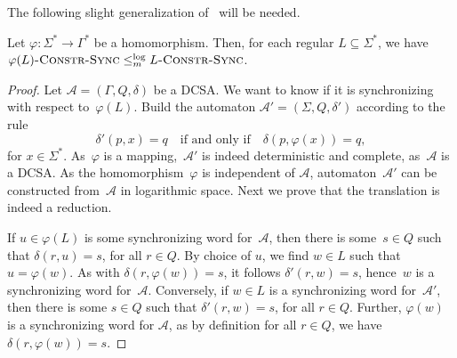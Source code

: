 The following slight generalization  %
of~\cite[Theorem 27]{DBLP:conf/mfcs/FernauGHHVW19} will be needed.

\begin{propositionrep}
\label{prop:hom_lower_bound_complexity}
 Let $\varphi \colon \Sigma^* \to \Gamma^*$ be a homomorphism.
 Then, for each regular $L \subseteq \Sigma^*$, we have 
 $\varphi(L)\textsc{-Constr-Sync} \le_m^{\log} L\textsc{-Constr-Sync}$.
\end{propositionrep}
\begin{proof}
 
 

 Let $\mathcal A = (\Gamma, Q, \delta)$ be a DCSA.
	We want to know if it is synchronizing with respect to~$\varphi(L)$.
	Build the automaton $\mathcal A' = (\Sigma, Q, \delta')$ according to the rule
	$$
	\delta'(p, x) = q\quad\mbox{if and only if}\quad
        \delta(p, \varphi(x)) = q,$$ for $x\in\Sigma^*$.
	As~$\varphi$ is a mapping,~$\mathcal A'$ is indeed deterministic and
        complete, as~$\mathcal A$ is a DCSA. As the homomorphism~$\varphi$ is
        independent of $\mathcal A$, automaton~$\mathcal A'$ can be constructed from~$\mathcal A$
        in logarithmic space.  Next we prove that the 
        translation is indeed a reduction.

        If $u \in \varphi(L)$ is some synchronizing word for~$\mathcal A$, then there is
        some~$s\in Q$ such that $\delta(r,u)=s$, for all $r\in Q$.  By
        choice of $u$, we find $w \in L$ such that $u = \varphi(w)$. As with
        $\delta(r,\varphi(w))=s$, it follows $\delta'(r,w)=s$, hence~$w$
        is a synchronizing word for~$\mathcal A$.
%	
        Conversely, if $w \in L$ is a synchronizing word
        for~$\mathcal A'$, then there is some $s\in Q$ such that
        $\delta'(r,w)=s$, for all $r\in Q$.  Further, $\varphi(w)$ is
        a synchronizing word for $\mathcal A$, as by definition for all $r\in
        Q$, we have $\delta(r,\varphi(w))=s$. 
\end{proof}



